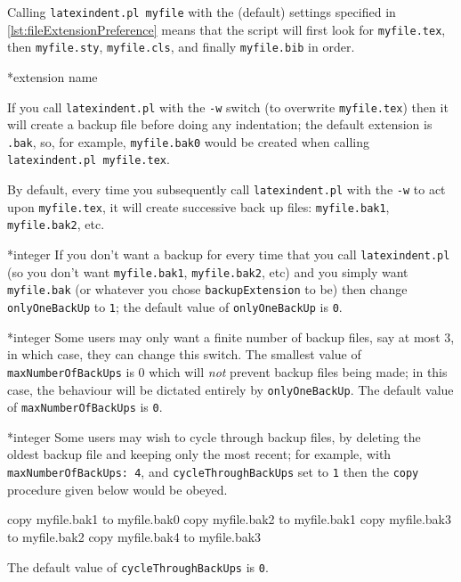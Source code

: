 \documentclass[10pt]{article}
\begin{document}
Calling \texttt{latexindent.pl myfile} with the (default) settings specified in \cref{lst:fileExtensionPreference}
means that the script will first look for \texttt{myfile.tex}, then \texttt{myfile.sty}, \texttt{myfile.cls},
and finally \texttt{myfile.bib} in order.

*{extension name}

If you call \texttt{latexindent.pl} with the \texttt{-w} switch (to overwrite
\texttt{myfile.tex}) then it will create a backup file before doing
any indentation; the default extension is \texttt{.bak}, so, for example, \texttt{myfile.bak0}
would be created when calling \texttt{latexindent.pl myfile.tex}.

By default, every time you subsequently call \texttt{latexindent.pl} with
the \texttt{-w} to act upon \texttt{myfile.tex}, it will create successive back up files: \texttt{myfile.bak1}, \texttt{myfile.bak2},
etc.

*{integer}
\label{page:onlyonebackup}
If you don't want a backup for every time that you call \texttt{latexindent.pl} (so
you don't want \texttt{myfile.bak1}, \texttt{myfile.bak2}, etc) and you simply
want \texttt{myfile.bak} (or whatever you chose \texttt{backupExtension} to be)
then change \texttt{onlyOneBackUp} to \texttt{1}; the default value of
\texttt{onlyOneBackUp} is \texttt{0}.

*{integer}
Some users may only want a finite number of backup files,
say at most $3$, in which case, they can change this switch.
The smallest value of \texttt{maxNumberOfBackUps} is $0$ which will \emph{not}
prevent backup files being made; in this case, the behaviour will be dictated
entirely by \texttt{onlyOneBackUp}. The default value of \texttt{maxNumberOfBackUps}
is \texttt{0}.

*{integer}
Some users may wish to cycle through backup files, by deleting the
oldest backup file and keeping only the most recent; for example,
with \texttt{maxNumberOfBackUps: 4}, and \texttt{cycleThroughBackUps}
set to \texttt{1}  then the \texttt{copy} procedure given below
would be obeyed.

\begin{commandshell}
copy myfile.bak1 to myfile.bak0
copy myfile.bak2 to myfile.bak1
copy myfile.bak3 to myfile.bak2
copy myfile.bak4 to myfile.bak3
	\end{commandshell}
The default value of \texttt{cycleThroughBackUps} is \texttt{0}.
\end{document}
